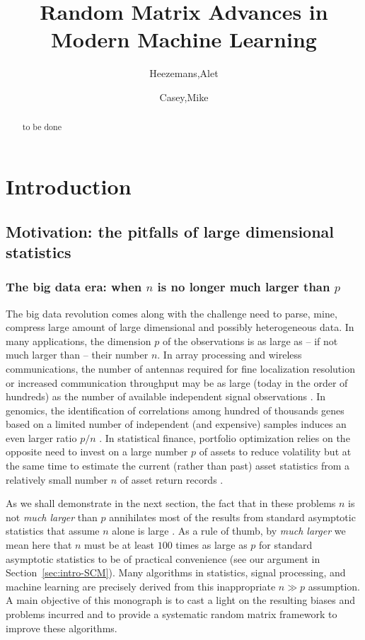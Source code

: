 \documentclass[MAL,biber]{nowfnt} %
\title{Random Matrix Advances in Modern Machine Learning}
\author[1]{Heezemans,Alet}
\author[2]{Casey,Mike}
\affil[1]{now publishers, Inc.; alet.heezemans@nowpublishers.com}
\affil[2]{now publishers, Inc.; mike.casey@nowpublishers.com}
\begin{document}
\makeabstracttitle

\begin{abstract}
to be done

\end{abstract}

\chapter{Introduction}
\label{chap:intro} 

\section{Motivation: the pitfalls of large dimensional statistics}
\label{sec:motivation}

\subsection{The big data era: when $n$ is no longer much larger than $p$}

The big data revolution comes along with the challenge need to parse, mine, compress large amount of large dimensional and possibly heterogeneous data. In many applications, the dimension $p$ of the observations is as large as -- if not much larger than -- their number $n$. In array processing and wireless communications, the number of antennas required for fine localization resolution or increased communication throughput may be as large (today in the order of hundreds) as the number of available independent signal observations \citep{lu2014overview,li2007mimo}. In genomics, the identification of correlations among hundred of thousands genes based on a limited number of independent (and expensive) samples induces an even larger ratio $p/n$ \citep{arnold1994evolutionary}. In statistical finance, portfolio optimization relies on the opposite need to invest on a large number $p$ of assets to reduce volatility but at the same time to estimate the current (rather than past) asset statistics from a relatively small number $n$ of asset return records \citep{laloux2000random}. 

As we shall demonstrate in the next section, the fact that in these problems $n$ is not \emph{much larger} than $p$ annihilates most of the results from standard asymptotic statistics that assume $n$ alone is large \citep{van2000asymptotic}. As a rule of thumb, by \emph{much larger} we mean here that $n$ must be at least $100$ times as large as $p$ for standard asymptotic statistics to be of practical convenience (see our argument in Section~\ref{sec:intro-SCM}). Many algorithms in statistics, signal processing, and machine learning are precisely derived from this inappropriate $n\gg p$ assumption. A main objective of this monograph is to cast a light on the resulting biases and problems incurred and to provide a systematic random matrix framework to improve these algorithms.
\end{document}
